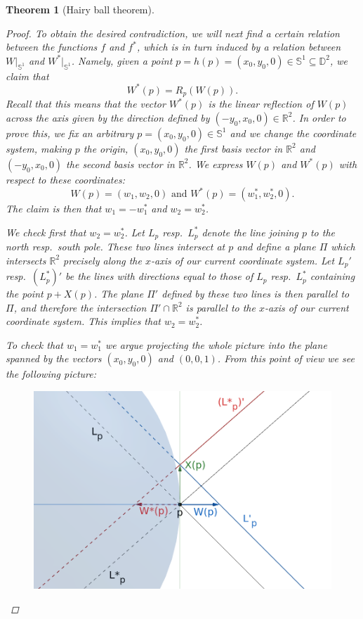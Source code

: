 \documentclass[A4paper, 12pt, british, reqno]{amsart}
\newcommand{\bbD}{\mathbb{D}}
\newcommand{\R}{\mathbb{R}} %
\newcommand{\bbS}{\mathbb{S}}
\theoremstyle{plain}
\newtheorem{thm}{Theorem}[section]
\theoremstyle{definition}
\theoremstyle{remark}
\theoremstyle{plain}
\theoremstyle{definition}
\theoremstyle{remark}
\theoremstyle{plain}
\theoremstyle{definition}
\theoremstyle{remark}
\begin{document}
\begin{thm}[Hairy ball theorem]
\begin{proof}
	To obtain the desired contradiction, we will next find a certain relation between the functions $f$ and $f^{*}$, which is in turn induced by a relation between $W|_{\bbS^{1}}$ and $W^{*}|_{\bbS^{1}}$.
	Namely, given a point $p=h(p)=(x_{0},y_{0},0)\in \bbS^{1}\subseteq \bbD^{2}$, we claim that
	\begin{equation}
	    W^{*}(p)=R_{p}(W(p)).
	\end{equation}
	Recall that this means that the vector $W^{*}(p)$ is the linear reflection of $W(p)$ across the axis given by the direction defined by $(-y_{0},x_{0},0)\in \R^{2}$.
	In order to prove this, we fix an arbitrary $p=(x_{0},y_{0},0)\in \bbS^{1}$ and we change the coordinate system, making $p$ the origin, $(x_{0},y_{0},0)$ the first basis vector in $\R^{2}$ and $(-y_{0},x_{0},0)$ the second basis vector in $\R^{2}$.
	We express $W(p)$ and $W^{*}(p)$ with respect to these coordinates:
	\[ W(p)=(w_{1},w_{2},0) \text{ and } W^{*}(p)=(w_{1}^{*},w_{2}^{*},0). \]
	The claim is then that $w_{1}=-w_{1}^{*}$ and $w_{2}=w_{2}^{*}$.

	We check first that $w_{2}=w_{2}^{*}$.
	Let $L_{p}$ resp.~$L_{p}^{*}$ denote the line joining $p$ to the north resp.~south pole.
	These two lines intersect at $p$ and define a plane $\Pi$ which intersects $\R^{2}$ precisely along the $x$-axis of our current coordinate system.
	Let $L_{p}'$ resp.~$(L_{p}^{*})'$ be the lines with directions equal to those of $L_{p}$ resp.~$L_{p}^{*}$ containing the point $p+X(p)$.
	The plane $\Pi'$ defined by these two lines is then parallel to $\Pi$, and therefore the intersection $\Pi'\cap \R^{2}$ is parallel to the $x$-axis of our current coordinate system.
	This implies that $w_{2}=w_{2}^{*}$.

	To check that $w_{1}=w_{1}^{*}$ we argue projecting the whole picture into the plane spanned by the vectors $(x_{0},y_{0},0)$ and $(0,0,1)$.
	From this point of view we see the following picture:
	
	\begin{figure}[htp]
	    \centering
	    \includegraphics[scale=.3]{HairyBall1.png}
	\end{figure}


\end{proof}
\end{thm}
\end{document}
